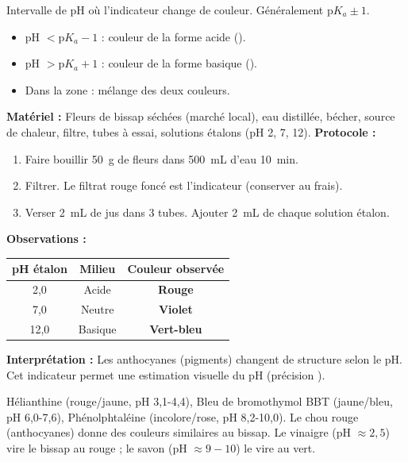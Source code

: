 \documentclass[11pt]{article}
\begin{document}
\begin{definition}
Intervalle de pH où l'indicateur change de couleur. Généralement $\text{p}K_a \pm 1$.
\begin{itemize}
    \item pH $< \text{p}K_a - 1$ : couleur de la forme acide ().
    \item pH $> \text{p}K_a + 1$ : couleur de la forme basique ().
    \item Dans la zone : mélange des deux couleurs.
\end{itemize}
\end{definition}

\begin{experience}
\textbf{Matériel :} Fleurs de bissap séchées (marché local), eau distillée, bécher, source de chaleur, filtre, tubes à essai, solutions étalons (pH 2, 7, 12).
\textbf{Protocole :}
\begin{enumerate}
    \item Faire bouillir \SI{50}{g} de fleurs dans \SI{500}{mL} d'eau \SI{10}{min}.
    \item Filtrer. Le filtrat rouge foncé est l'indicateur (conserver au frais).
    \item Verser \SI{2}{mL} de jus dans 3 tubes. Ajouter \SI{2}{mL} de chaque solution étalon.
\end{enumerate}
\textbf{Observations :}
\begin{center}
\begin{tabular}{|c|c|c|}
\hline
\rowcolor{popblueL} \textbf{pH étalon} & \textbf{Milieu} & \textbf{Couleur observée} \\
\hline
2,0 & Acide & \textbf{Rouge} \\
7,0 & Neutre & \textbf{Violet} \\
12,0 & Basique & \textbf{Vert-bleu} \\
\hline
\end{tabular}
\end{center}
\textbf{Interprétation :} Les anthocyanes (pigments) changent de structure selon le pH. Cet indicateur permet une estimation visuelle du pH (précision \approx {}).
\end{experience}

\begin{savaistu}
Hélianthine (rouge/jaune, pH 3,1-4,4), Bleu de bromothymol BBT (jaune/bleu, pH 6,0-7,6), Phénolphtaléine (incolore/rose, pH 8,2-10,0). Le chou rouge (anthocyanes) donne des couleurs similaires au bissap. Le vinaigre (pH $\approx 2,5$) vire le bissap au rouge ; le savon (pH $\approx 9-10$) le vire au vert.
\end{savaistu}
\end{document}
